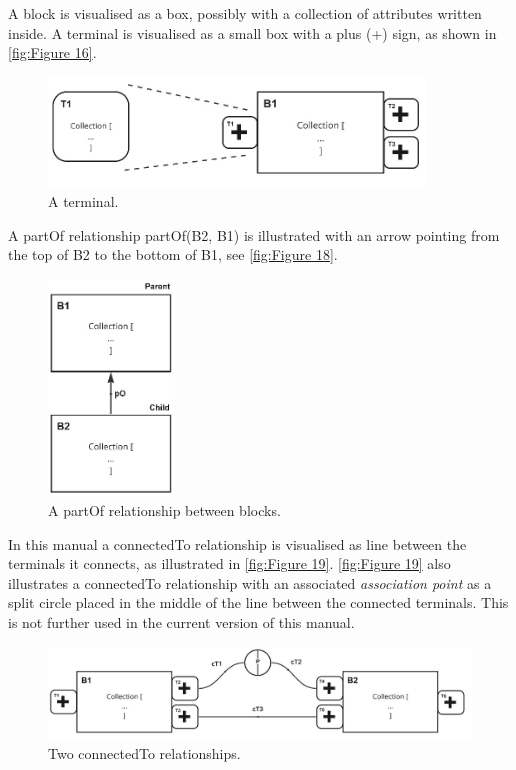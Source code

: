 \documentclass[../main.tex]{subfiles}
\begin{document}
A block is visualised as a box, possibly with a collection of attributes written inside. A terminal is visualised as a small box with a plus (+) sign, as shown in \autoref{fig:Figure 16}.

\begin{figure}[htb]
  \centering
  \includegraphics[width=3.94162in,height=1.15217in]{img/ontology/element-terminal.jpg}
  \caption{A terminal.}
  \label{fig:Figure 16}
\end{figure}


A partOf relationship partOf(B2, B1) is illustrated with an arrow pointing from the top of B2 to the bottom of B1, see \autoref{fig:Figure 18}.

\begin{figure}[htb]
  \centering
  \includegraphics[width=1.3221in,height=2.26735in]{img/ontology/element-partOf.jpg}
  \caption{A partOf relationship between blocks.}
  \label{fig:Figure 18}
\end{figure}

 In this manual a connectedTo relationship is visualised as line between the terminals it connects, as illustrated in
\autoref{fig:Figure 19}.  \autoref{fig:Figure 19} also illustrates 
a connectedTo relationship with
an associated \emph{association point} as a split circle placed in the
middle of the line between the connected terminals. This is not further used in the current version of this manual. 

\begin{figure}[htb]
  \centering
  \includegraphics[width=.8\textwidth]{img/ontology/element-connectedTo.jpg}
  \caption{Two connectedTo relationships.}
  \label{fig:Figure 19}
\end{figure}
\end{document}
